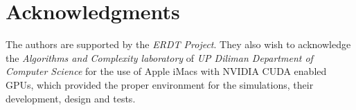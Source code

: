 \documentclass{acm_proc_article-sp}
\begin{document}

\section{ Acknowledgments }
The authors are supported by the \textit{ERDT Project}. They also wish to acknowledge the \textit{Algorithms and Complexity laboratory} of \textit{UP Diliman Department of Computer Science} for the use of Apple iMacs with NVIDIA CUDA enabled GPUs, which provided the proper environment for the simulations, their development, design and tests.



%
%
\end{document}
